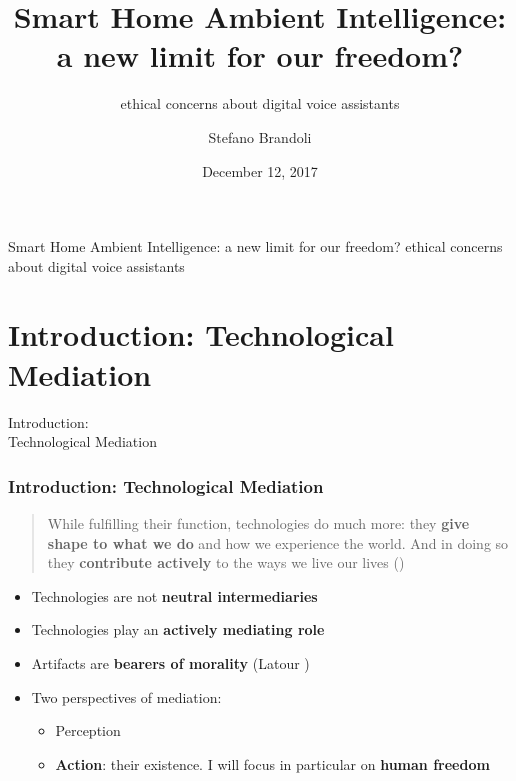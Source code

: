 \documentclass{beamer}
\title{Smart Home Ambient Intelligence: \\a new limit for our freedom?}
\subtitle{\vspace*{0.3cm}ethical concerns about digital voice assistants}
\author[Stefano Brandoli]{Stefano Brandoli}
\institute[PoliMi]{Politecnico di Milano}
\date{December 12, 2017}
\begin{document}
\begin{frame}
\maketitle
\end{frame}

\begin{frame}
\begin{center}{\vspace*{-0.5cm}Smart Home Ambient Intelligence: a new limit for our freedom?
ethical concerns about digital voice assistants}
\end{center}


\tableofcontents
\end{frame}

\section{Introduction: Technological Mediation}

\begin{frame}
\begin{center}
	 Introduction:\\Technological Mediation
\end{center}
\end{frame}

\begin{frame}
\frametitle{Introduction: Technological Mediation}
\begin{quote}
	While fulfilling their function, technologies do
much more: they \textbf{give shape to what we do} and how we experience the world.
And in doing so they \textbf{contribute actively} to the ways we live our lives (\cite{verbeek2011moralizing})
\end{quote}

\begin{itemize}
	\item Technologies are not \textbf{neutral intermediaries}
	\item Technologies play an \textbf{actively mediating role} 
	\item Artifacts are \textbf{bearers of morality} (Latour )%
	
	\item Two perspectives of mediation:
	\begin{itemize}
		\item Perception
		\item \textbf{Action}: 
	their existence. %
				I will focus in particular on \textbf{human freedom}
		
	\end{itemize}
\end{itemize}
\end{frame}
\end{document}

